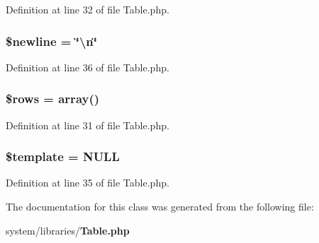 Definition at line 32 of file Table.\-php.

\subsubsection[{\$newline}]{\setlength{\rightskip}{0pt plus 5cm}\$newline = \char`\"{}\textbackslash{}n\char`\"{}}\label{class_c_i___table_a8735d5c31c4af1004825e6a28f236aeb}


Definition at line 36 of file Table.\-php.

\subsubsection[{\$rows}]{\setlength{\rightskip}{0pt plus 5cm}\$rows = array()}\label{class_c_i___table_ace2ec39e7df3899fa8df9640ec274b03}


Definition at line 31 of file Table.\-php.

\subsubsection[{\$template}]{\setlength{\rightskip}{0pt plus 5cm}\$template = N\-U\-L\-L}\label{class_c_i___table_aa3e9534005fd516d941f6a5569896e01}


Definition at line 35 of file Table.\-php.



The documentation for this class was generated from the following file\-:\begin{DoxyCompactItemize}
\item 
system/libraries/{\bf Table.\-php}\end{DoxyCompactItemize}
